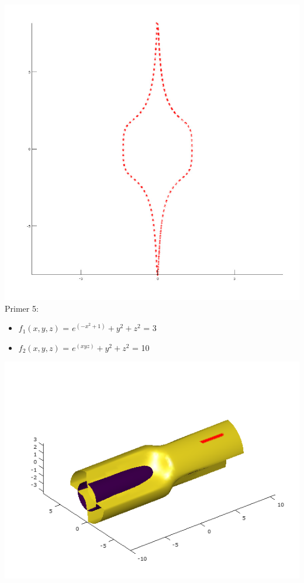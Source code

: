 \documentclass[]{article}
\begin{document}
	\includegraphics[scale=0.3]{primer4_3}
	\\
	Primer 5:
	\begin{itemize}  
		\item $f_{1}(x,y,z)$ = $e^{(-x^{2}+1)}+y^{2}+z^{2}$ = 3
		\item $f_{2}(x,y,z)$ = $e^{(xyz)}+y^{2}+z^{2}$ = 10
	\end{itemize}
	\includegraphics[scale=0.5]{primer5_1}
\end{document}
